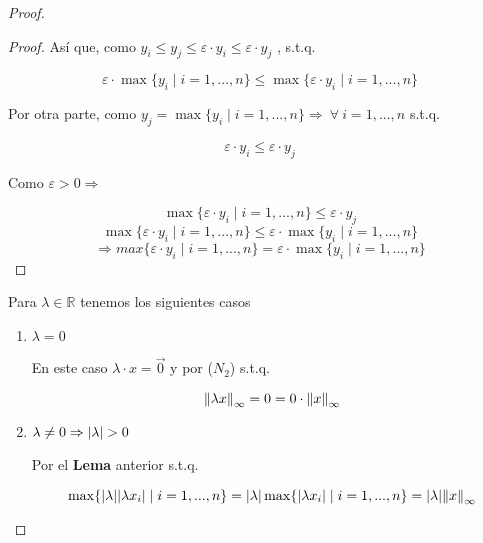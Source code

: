\documentclass[12pt]{article}
\newcommand{\subscript}[2]{$#1 _ #2$}
\newcommand\R{\ensuremath{\mathbb{R}}}
\begin{document}
\begin{enumerate}[label=\textbf{\arabic*}.]
\begin{proof}
\begin{enumerate}[label=(\subscript{N}{{\arabic*}})]
\begin{proof}
    Así que, como $ y_i \leqslant y_j \leqslant \varepsilon \cdot y_i \leqslant \varepsilon \cdot y_j$ , s.t.q.

    \begin{equation*}
        \varepsilon \cdot \max \{ y_i \mid i = 1,...,n\} \leqslant \max \{ \varepsilon \cdot y_i \mid i = 1,...,n\}
    \end{equation*}

    Por otra parte, como $y_j = \max \{ y_i \mid i = 1,...,n\} \Rightarrow \: \forall \: i = 1,...,n $ s.t.q.
    
    \begin{equation*}
         \varepsilon \cdot y_i \leqslant \varepsilon \cdot y_j
    \end{equation*}

    Como $\varepsilon > 0 \Rightarrow$

    \begin{equation*}
        \max \{ \varepsilon \cdot y_i \mid i = 1,...,n\} \leqslant \varepsilon \cdot y_j 
    \end{equation*}
    \begin{equation*}
        \max \{ \varepsilon \cdot y_i \mid i = 1,...,n\} \leqslant \varepsilon \cdot \max \{ y_i \mid i = 1,...,n\} 
    \end{equation*}
    \begin{equation*}
        \Rightarrow max \{ \varepsilon \cdot y_i \mid i = 1,...,n\} = \varepsilon \cdot \max \{ y_i \mid i = 1,...,n\} 
    \end{equation*}
\end{proof}

Para $\lambda \in \R$ tenemos los siguientes casos

\begin{enumerate}
    \item $\lambda = 0$

    En este caso $\lambda \cdot x = \vec{0}$ y por ($N_2$) s.t.q.

    \begin{equation*}
        {\norm{\lambda x}}_{\infty} = 0 = 0 \cdot {\norm{ x}}_{\infty}
    \end{equation*}

    \item $\lambda \neq 0 \Rightarrow \abs{\lambda} > 0$

    Por el \textbf{Lema} anterior s.t.q.

    \begin{equation*}
        \max \{ \abs{\lambda } \abs{{\lambda x}_{i}} \mid i = 1,...,n\} = \abs{\lambda } \max \{  \abs{{\lambda x}_{i}} \mid i = 1,...,n\} = \abs{\lambda } {\norm{ x}}_{\infty}
    \end{equation*}
    

\end{enumerate}
\end{enumerate}
\end{proof}
\end{enumerate}
\end{document}
